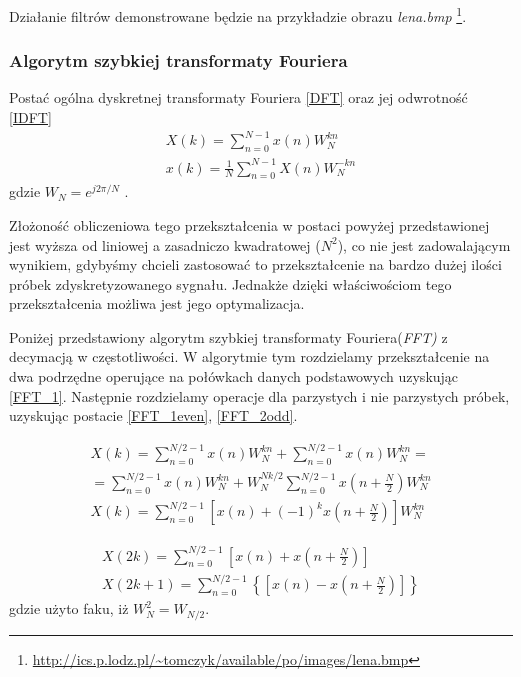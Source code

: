 \documentclass{classrep}
\begin{document}
Działanie filtrów demonstrowane będzie na przykładzie obrazu \emph{lena.bmp} \footnote{\url{http://ics.p.lodz.pl/~tomczyk/available/po/images/lena.bmp}}.

\subsubsection{Algorytm szybkiej transformaty Fouriera}

Postać ogólna dyskretnej transformaty Fouriera \ref{DFT} oraz jej odwrotność \ref{IDFT}
\begin{eqnarray}
\label{DFT}  X(k) = \sum \limits ^{N-1} _{n=0} x(n) W ^{kn} _{N}\\
\label{IDFT}  x(k) = \frac{1}{N} \sum \limits ^{N-1} _{n=0} X(n) W ^{-kn} _{N}
\end{eqnarray}
gdzie $W _N  = e^{j2 \pi / N}$ .

Złożoność obliczeniowa tego przekształcenia w postaci powyżej przedstawionej jest wyższa od liniowej a zasadniczo kwadratowej ($N^2$), co nie jest zadowalającym wynikiem, gdybyśmy chcieli zastosować to przekształcenie na bardzo dużej ilości próbek zdyskretyzowanego sygnału. Jednakże dzięki właściwościom tego przekształcenia możliwa jest jego optymalizacja.

Poniżej przedstawiony algorytm szybkiej transformaty Fouriera(\emph{FFT)} z decymacją w częstotliwości. W algorytmie tym rozdzielamy przekształcenie na dwa podrzędne operujące na połówkach danych podstawowych uzyskując \ref{FFT_1}. Następnie rozdzielamy operacje dla parzystych i nie parzystych próbek, uzyskując postacie \ref{FFT_1even}, \ref{FFT_2odd}. 

\begin{multline}
X(k) = \sum \limits ^{N/2-1} _{n=0} x(n) W ^{kn} _{N} + \sum \limits ^{N/2-1} _{n=0} x(n) W ^{kn} _{N} = \\
= \sum \limits ^{N/2-1} _{n=0} x(n) W ^{kn} _{N} + W ^{N k/2} _{N} \sum \limits ^{N/2-1} _{n=0} x \left( n + \frac{N}{2} \right) W ^{kn} _{N} \\
\label{FFT_1} X(k) = \sum \limits ^{N/2-1} _{n=0} \left[ x(n) + (-1) ^{k} x(n+\frac{N}{2} ) \right]W ^{kn} _{N}
\end{multline}

\begin{eqnarray}
\label{FFT_1even} X(2k) = \sum \limits ^{N/2-1} _{n=0} \left[ x(n) + x \left(  n+\frac{N}{2} \right)  \right]\\
\label{FFT_2odd} X(2k+1) = \sum \limits ^{N/2-1} _{n=0} \left\{ \left[ x(n) - x \left(  n+\frac{N}{2} \right) \right] \right\}
\end{eqnarray}
gdzie użyto faku, iż $W _N ^2  = W _{N/2}$.
\end{document}
